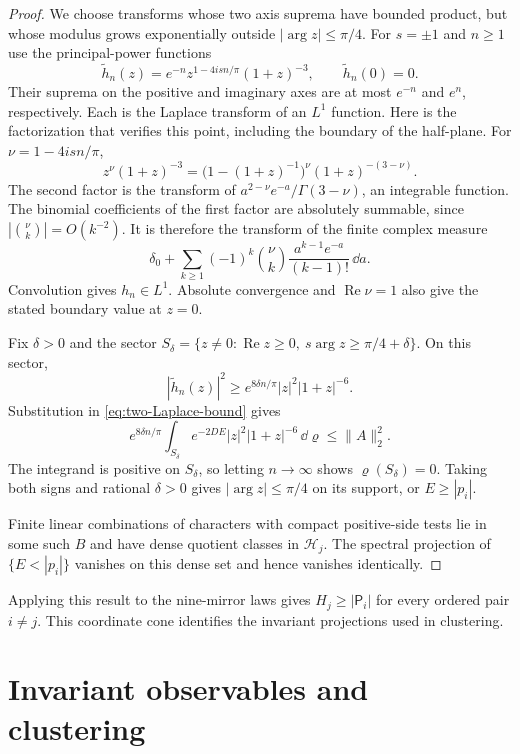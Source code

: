 \begin{proof}
We choose transforms whose two axis suprema have bounded product,
but whose modulus grows exponentially outside $|\arg z|\le\pi/4$.
For $s=\pm1$ and $n\ge1$ use the principal-power functions
\begin{equation}\label{eq:cone-Laplace-tests}
 \widetilde h_n(z)
 =e^{-n}z^{1-4isn/\pi}(1+z)^{-3},\qquad
 \widetilde h_n(0)=0.
\end{equation}
Their suprema on the positive and imaginary axes are at most
$e^{-n}$ and $e^n$, respectively. Each is the Laplace transform of
an $L^1$ function. Here is the factorization that verifies this
point, including the boundary of the half-plane. For
$\nu=1-4isn/\pi$,
\[
 z^\nu(1+z)^{-3}
 =\bigl(1-(1+z)^{-1}\bigr)^\nu(1+z)^{-(3-\nu)}.
\]
The second factor is the transform of
$a^{2-\nu}e^{-a}/\Gamma(3-\nu)$, an integrable function.
The binomial coefficients of the first factor are absolutely
summable, since $|\binom\nu k|=O(k^{-2})$. It is therefore the
transform of the finite complex measure
\[
 \delta_0+
 \sum_{k\ge1}(-1)^k\binom\nu k
 \frac{a^{k-1}e^{-a}}{(k-1)!}\,\dd a.
\]
Convolution gives $h_n\in L^1$. Absolute convergence and
$\operatorname{Re}\nu=1$ also give the stated boundary value at
$z=0$.

Fix $\delta>0$ and the sector
$S_\delta=\{z\ne0:\operatorname{Re}z\ge0,
\ s\arg z\ge\pi/4+\delta\}$. On this sector,
\[
 |\widetilde h_n(z)|^2
 \ge e^{8\delta n/\pi}|z|^2|1+z|^{-6}.
\]
Substitution in \eqref{eq:two-Laplace-bound} gives
\[
 e^{8\delta n/\pi}
 \int_{S_\delta}e^{-2DE}|z|^2|1+z|^{-6}\,\dd\varrho
 \le\|A\|_2^2.
\]
The integrand is positive on $S_\delta$, so letting $n\to\infty$
shows $\varrho(S_\delta)=0$. Taking both signs and rational
$\delta>0$ gives $|\arg z|\le\pi/4$ on its support, or
$E\ge|p_i|$.

Finite linear combinations of characters with compact positive-side
tests lie in some such $B$ and have dense quotient classes in
$\mathcal H_j$. The spectral projection of $\{E<|p_i|\}$
vanishes on this dense set and hence vanishes identically.
\end{proof}

Applying this result to the nine-mirror laws gives
$H_j\ge|\mathsf P_i|$ for every ordered pair $i\ne j$. This coordinate
cone identifies the invariant projections used in clustering.

\section{Invariant observables and clustering}
\label{subsec:invariant-reflection}

